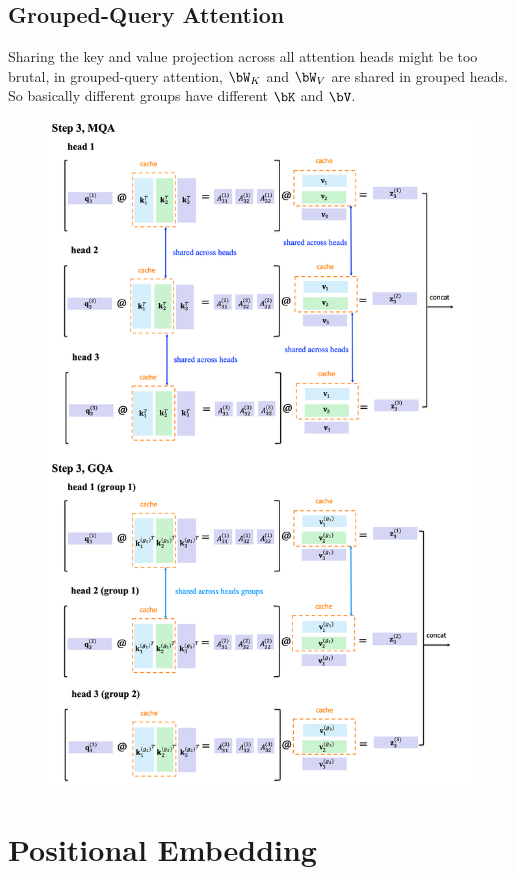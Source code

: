 \documentclass{article}
\begin{document}
\subsection{Grouped-Query Attention}
Sharing the key and value projection across all attention heads might be too brutal, in grouped-query attention, $\bW_K$ and $\bW_V$ are shared in grouped heads.
So basically different groups have different $\bK$ and $\bV$.

\begin{figure}[!h]
	\centering
	\includegraphics[scale=0.45]{imgs/GQA.png}
\end{figure}

\clearpage
\section{Positional Embedding}
\end{document}
